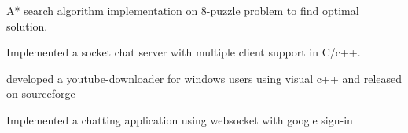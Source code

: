 



\begin{cventries}

\cvproject
{
    \begin{cvitems} %
        \item {A* search algorithm implementation on 8-puzzle problem to find optimal solution.}
        \item {Implemented a socket chat server with multiple client support in C/c++.}
        \item {developed a youtube-downloader for windows users using visual c++ and released on sourceforge }
        \item {Implemented a chatting application using websocket with google sign-in }
        \end{cvitems}
}

\end{cventries}